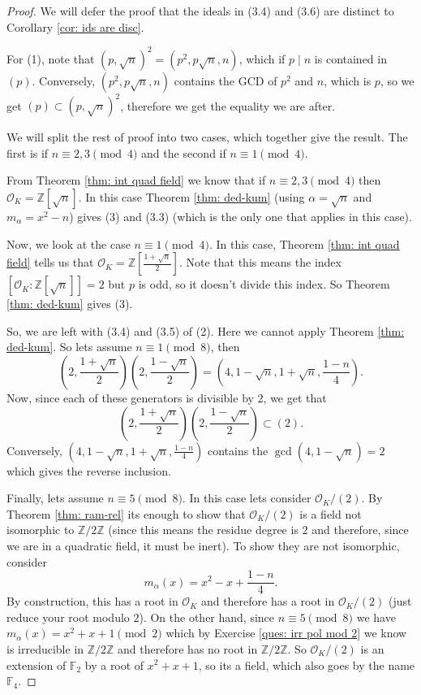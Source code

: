 \documentclass[11pt,a4paper]{report}
\theoremstyle{plain}
\theoremstyle{definition}
\theoremstyle{definition}
\newcommand{\ZZ}{\mathbb{Z}}
\def\FF{\mathbb{F}}
\def \a{\alpha}
\def \OO {\mathcal{O}}
\begin{document}
	\begin{proof}
		
		We will defer the proof that the ideals in  (3.4) and (3.6)	are distinct to Corollary \ref{cor: ids are disc}.
		
		For (1), note that $(p,\sqrt{n})^2=(p^2,p\sqrt{n},n)$, which if $p \mid n$ is contained in $(p)$. Conversely,	$(p^2,p\sqrt{n},n)$ contains the GCD of $p^2$ and $n$, which is $p$, so we get $(p) \subset (p,\sqrt{n})^2$, therefore we get the equality we are after.
		
		We will split the rest of proof into two cases, which together give the result. The first is if $n \equiv 2,3 \pmod 4$ and the second if $n \equiv 1 \pmod 4$.	
		
		From Theorem \ref{thm: int quad field} we know that if $n \equiv 2,3 \pmod 4$ then $\OO_K=\ZZ[\sqrt{n}]$. In this case Theorem \ref{thm: ded-kum} (using $\a=\sqrt{n}$ and $m_\a=x^2-n$) gives (3) and (3.3) (which is the only one that applies in this case).
		
		Now, we look at the case $n \equiv 1 \pmod 4$. In this case, Theorem \ref{thm: int quad field} tells us that $\OO_K=\ZZ[\frac{1+\sqrt{n}}{2}]$. Note that this means the index $[\OO_K:\ZZ[\sqrt{n}]]=2$ but $p$ is odd, so it doesn't divide this index. So Theorem \ref{thm: ded-kum}  gives (3).
		
		So, we are left with (3.4) and (3.5) of (2). Here we cannot apply Theorem \ref{thm: ded-kum}. So lets assume $n \equiv 1 \pmod 8$, then  \[ 	\left (2,\frac{1+\sqrt{n}}{2}\right )\left (2,\frac{1-\sqrt{n}}{2}\right )=\left(4,1-\sqrt{n},1+\sqrt{n},\frac{1-n}{4}\right).\]  Now, since each of these generators is divisible by $2$, we get that  	\[\left(2,\frac{1+\sqrt{n}}{2}\right)\left(2,\frac{1-\sqrt{n}}{2}\right) \subset (2).\] Conversely, $\left(4,1-\sqrt{n},1+\sqrt{n},\frac{1-n}{4}\right)$ contains the $\gcd(4,1-\sqrt{n})=2$ which gives the reverse inclusion. 
		
		Finally, lets assume $n \equiv 5 \pmod 8$. In this case lets consider $\OO_K/(2)$. By Theorem \ref{thm: ram-rel} its enough to show that $\OO_K/(2)$ is a field not isomorphic to $\ZZ/2\ZZ$ (since this means the residue degree is $2$ and therefore, since we are in a quadratic field, it must be inert). To show they are not isomorphic, consider \[m_\a(x)=x^2-x+\frac{1-n}{4}.\] By construction, this has a root in $\OO_K$ and therefore has a root in $\OO_K/(2)$ (just reduce your root modulo $2$). On the other hand, since $n \equiv 5 \pmod 8$ we have $m_\a(x)=x^2+x+1 \pmod 2$ which by  Exercise \ref{ques: irr pol mod 2} we know is irreducible in $\ZZ/2\ZZ$ and therefore has no root in $\ZZ/2\ZZ$. So $\OO_K/(2)$ is an extension of $\FF_2$ by a root of $x^2+x+1$, so its a field, which also goes by the name $\FF_4$. 
		
		
		
		
	\end{proof}
	
\end{document}
